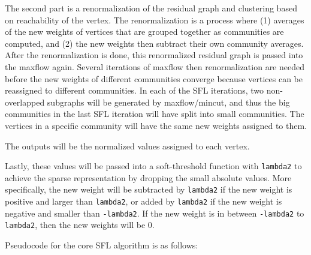 \documentclass[10pt,oneside]{memoir}
\begin{document}
The second part is a renormalization of the residual graph and
clustering based on reachability of the vertex. The renormalization is a
process where (1) averages of the new weights of vertices that are
grouped together as communities are computed, and (2) the new weights
then subtract their own community averages. After the renormalization is
done, this renormalized residual graph is passed into the maxflow again.
Several iterations of maxflow then renormalization are needed before the
new weights of different communities converge because vertices can be
reassigned to different communities. In each of the SFL iterations, two
non-overlapped subgraphs will be generated by maxflow/mincut, and thus
the big communities in the last SFL iteration will have split into small
communities. The vertices in a specific community will have the same new
weights assigned to them.

The outputs will be the normalized values assigned to each vertex.

Lastly, these values will be passed into a soft-threshold function with
\texttt{lambda2} to achieve the sparse representation by dropping the
small absolute values. More specifically, the new weight will be
subtracted by \texttt{lambda2} if the new weight is positive and larger
than \texttt{lambda2}, or added by \texttt{lambda2} if the new weight is
negative and smaller than \texttt{-lambda2}. If the new weight is in
between \texttt{-lambda2} to \texttt{lambda2}, then the new weights will
be 0.

Pseudocode for the core SFL algorithm is as follows:
\end{document}
